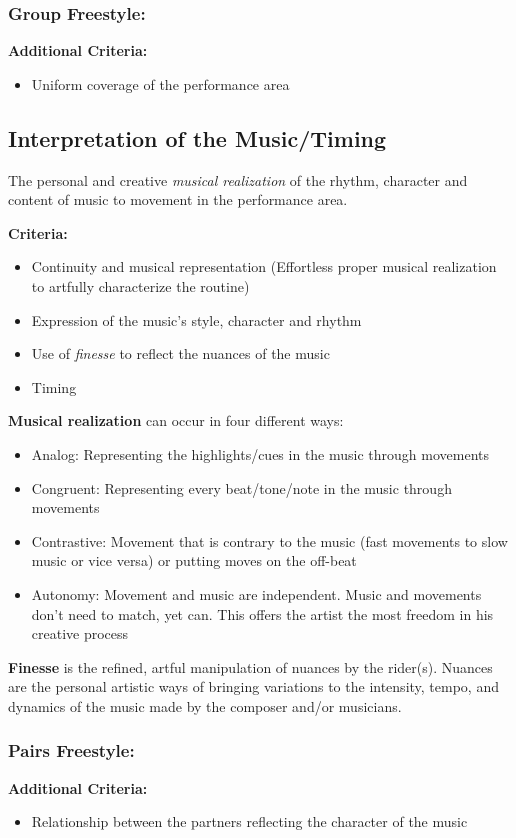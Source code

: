 \subsubsection{Group Freestyle:}
\textbf{Additional Criteria:}
\begin{itemize}
\item Uniform coverage of the performance area
\end{itemize}

\subsection{Interpretation of the Music/Timing}
The personal and creative \emph{musical realization} of the rhythm, character and content of music to movement in the performance area.

\textbf{Criteria:}
\begin{itemize}
\item Continuity and musical representation (Effortless proper musical realization to artfully characterize the routine)
\item Expression of the music's style, character and rhythm
\item Use of \emph{finesse} to reflect the nuances of the music
\item Timing
\end{itemize}

\textbf{Musical realization} can occur in four different ways:
\begin{itemize}
\item Analog: Representing the highlights/cues in the music through movements
\item Congruent: Representing every beat/tone/note in the music through movements
\item Contrastive: Movement that is contrary to the music (fast movements to slow music or vice versa) or putting moves on the off-beat
\item Autonomy: Movement and music are independent.
Music and movements don't need to match, yet can.
This offers the artist the most freedom in his creative process
\end{itemize}

\textbf{Finesse} is the refined, artful manipulation of nuances by the rider(s).
Nuances are the personal artistic ways of bringing variations to the intensity, tempo, and dynamics of the music made by the composer and/or musicians.

\subsubsection{Pairs Freestyle:}
\textbf{Additional Criteria:}
\begin{itemize}
\item Relationship between the partners reflecting the character of the music
\end{itemize}

